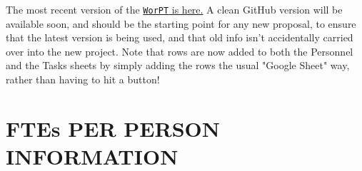 \documentclass[usenames,dvipsnames,modern]{CLASS_FILES/aastex631}
\begin{document}
The most recent version of the \href{https://docs.google.com/spreadsheets/d/1J9svcoISn2EjHlWNVp2gkKhlgJeGj1BwTQ4coAc9_8E/edit#gid=901021069}{\texttt{WorPT} is here.} A clean GitHub version will be available soon, and should be the starting point for any new proposal, to ensure that the latest version is being used, and that old info isn't accidentally carried over into the new project.  Note that rows are now added to both the Personnel and the Tasks sheets by simply adding the rows the usual "Google Sheet" way, rather than having to hit a button! 

\newpage
\mbox{} \vfill \section{FTEs PER PERSON INFORMATION} \vfill \mbox{}

\newpage
\end{document}
